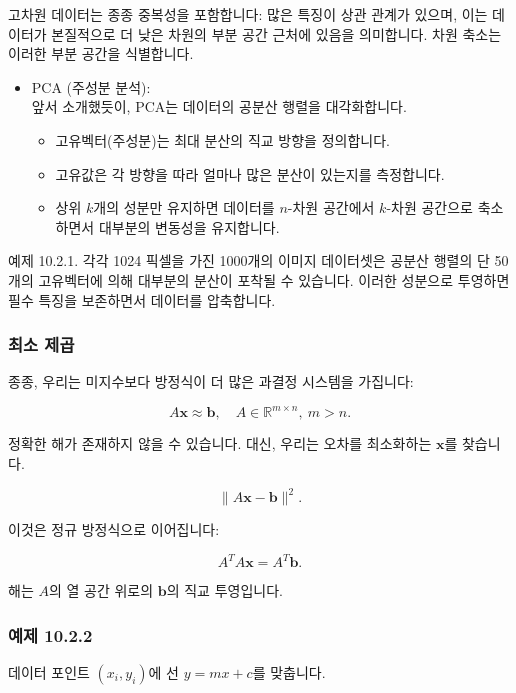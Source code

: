 \documentclass[
  12pt,
  a4paper,
]{article}
\begin{document}
고차원 데이터는 종종 중복성을 포함합니다: 많은 특징이 상관 관계가 있으며, 이는 데이터가 본질적으로 더 낮은 차원의 부분 공간 근처에 있음을 의미합니다. 차원 축소는 이러한 부분 공간을 식별합니다.

\begin{itemize}
\item
  PCA (주성분 분석):\\
  앞서 소개했듯이, PCA는 데이터의 공분산 행렬을 대각화합니다.

  \begin{itemize}
  \item
    고유벡터(주성분)는 최대 분산의 직교 방향을 정의합니다.
  \item
    고유값은 각 방향을 따라 얼마나 많은 분산이 있는지를 측정합니다.
  \item
    상위 \(k\)개의 성분만 유지하면 데이터를 \(n\)-차원 공간에서 \(k\)-차원 공간으로 축소하면서 대부분의 변동성을 유지합니다.
  \end{itemize}
\end{itemize}

예제 10.2.1. 각각 1024 픽셀을 가진 1000개의 이미지 데이터셋은 공분산 행렬의 단 50개의 고유벡터에 의해 대부분의 분산이 포착될 수 있습니다. 이러한 성분으로 투영하면 필수 특징을 보존하면서 데이터를 압축합니다.

\subsubsection{최소 제곱}\label{least-squares}

종종, 우리는 미지수보다 방정식이 더 많은 과결정 시스템을 가집니다:

\[A\mathbf{x} \approx \mathbf{b}, \quad A \in \mathbb{R}^{m \times n}, \ m > n.\]

정확한 해가 존재하지 않을 수 있습니다. 대신, 우리는 오차를 최소화하는 \(\mathbf{x}\)를 찾습니다.

\[\|A\mathbf{x} - \mathbf{b}\|^2.\]

이것은 정규 방정식으로 이어집니다:

\[A^T A \mathbf{x} = A^T \mathbf{b}.\]

해는 \(A\)의 열 공간 위로의 \(\mathbf{b}\)의 직교 투영입니다.

\subsubsection{예제 10.2.2}\label{example-1022}

데이터 포인트 \((x_i, y_i)\)에 선 \(y = mx + c\)를 맞춥니다.
\end{document}

